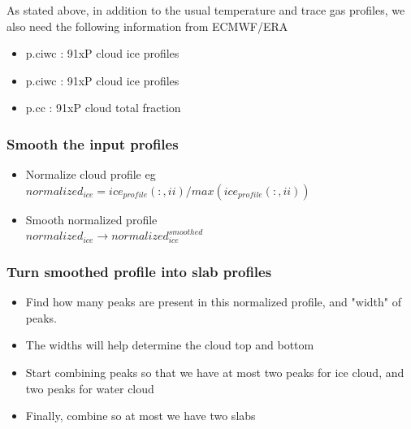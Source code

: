 \documentclass[11pt]{article}
\begin{document}
As stated above, in addition to the usual temperature and trace gas profiles, we also need the following information 
from ECMWF/ERA
\begin{itemize}
  \item p.ciwc : 91xP           cloud ice profiles
  \item p.ciwc : 91xP           cloud ice profiles
  \item p.cc   : 91xP           cloud total fraction
\end{itemize}

\subsubsection{Smooth the input profiles}
\begin{itemize}
  \item Normalize cloud profile eg \\ \hspace{1in} $normalized_{ice} = ice_{profile}(:,ii)/max(ice_{profile}(:,ii))$ 
  \item Smooth normalized profile  \\ \hspace{1in} $normalized_{ice} \rightarrow normalized_{ice}^{smoothed}$ 
\end{itemize}

\subsubsection{Turn smoothed profile into slab profiles}
\begin{itemize}
  \item Find how many peaks are present in this normalized profile, and "width" of peaks. 
  \item The widths will help determine the cloud top and bottom
  \item Start combining peaks so that we have at most two peaks for ice cloud, and two peaks for water cloud
  \item Finally, combine so at most we have two slabs
\end{itemize}
\end{document}
